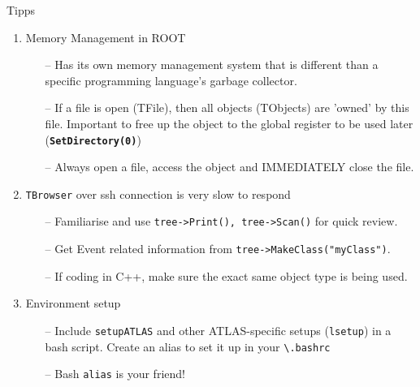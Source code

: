 \documentclass[10pt, aspectratio=169]{beamer}
\begin{document}
\begin{frame}{Tipps}
	\begin{enumerate}
		\item
		Memory Management in ROOT
		\begin{itemize}
			\item[--] Has its own memory management system that is different than a specific programming language's garbage collector.
			\item[--] If a file is open (TFile), then all objects (TObjects) are 'owned' by this file. Important to free up the object to the global register to be used later (\textbf{\texttt{SetDirectory(0)}})
			\item[--] Always open a file, access the object and IMMEDIATELY close the file.
		\end{itemize}
		\item
		\texttt{TBrowser} over ssh connection is very slow to respond
		\begin{itemize}
			\item[--] Familiarise and use \texttt{tree->Print(), tree->Scan()} for quick review.
			\item[--] Get Event related information from \texttt{tree->MakeClass("myClass")}.
			\item[--] If coding in C++, make sure the exact same object type is being used.
		\end{itemize}
		\item
		Environment setup
		\begin{itemize}
			\item[--] Include \texttt{setupATLAS} and other ATLAS-specific setups (\texttt{lsetup}) in a bash script. Create an alias to set it up in your \texttt{\textbackslash.bashrc} 
			\item[--] Bash \texttt{alias} is your friend!
		\end{itemize}
	\end{enumerate}
\end{frame}
\end{document}
